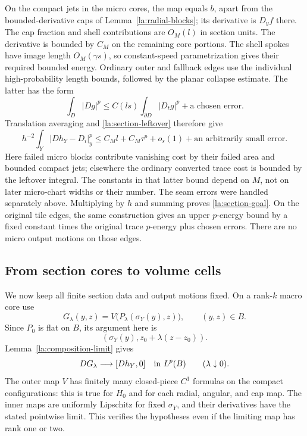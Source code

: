 On the compact jets in the micro cores, the map equals $b$, apart
from the bounded-derivative caps of Lemma~\ref{la:radial-blocks}; its
derivative is $D_yf$ there.  The cap fraction and shell contributions
are $O_M(l)$ in section units.  The derivative is bounded by $C_M$
on the remaining core portions.  The shell spokes have image length
$O_M(\gamma s)$, so constant-speed parametrization gives their
required bounded energy.  Ordinary outer and fallback edges use the
individual high-probability length bounds, followed by the planar
collapse estimate.  The latter has the form
\[
 \int_D|Dg|^p
       \le C(ls)\int_{\partial D}|D_tg|^p+\text{a chosen error}.
\]
Translation averaging and \eqref{la:section-leftover} therefore give
\begin{equation}\label{la:micro-section-error}
 h^{-2}\int_Y|Dh_Y-D_i|_y^p
       \le C_M l+C_M\tau^p+o_s(1)
                 +\text{an arbitrarily small error}.
\end{equation}
Here failed micro blocks contribute vanishing cost by their failed
area and bounded compact jets; elsewhere the ordinary converted
trace cost is bounded by the leftover integral.  The constants in
that latter bound depend on $M$, not on later micro-chart widths or
their number.  The seam errors were handled separately above.
Multiplying by $h$ and summing proves \eqref{la:section-goal}.
On the original tile edges, the same construction gives an upper
$p$-energy bound by a fixed constant times the original trace
$p$-energy plus chosen errors.  There are no micro output motions
on those edges.

\subsection{From section cores to volume cells}

We now keep all finite section data and output motions fixed.  On a
rank-$k$ macro core use
\begin{equation}\label{la:kernel-core-map}
 G_\lambda(y,z)
   =V\bigl(P_\lambda(\sigma_Y(y),z)\bigr),\qquad(y,z)\in B.
\end{equation}
Since $P_0$ is flat on $B$, its argument here is
\[
 (\sigma_Y(y),z_0+\lambda(z-z_0)).
\]
Lemma~\ref{la:composition-limit} gives
\begin{equation}\label{la:kernel-core-limit}
 DG_\lambda\longrightarrow[Dh_Y,0]
       \quad\hbox{in }L^p(B)\qquad(\lambda\downarrow0).
\end{equation}
The outer map $V$ has finitely many closed-piece $C^1$ formulas on
the compact configurations: this is true for $H_0$ and for each
radial, angular, and cap map.  The inner maps are uniformly Lipschitz
for fixed $\sigma_Y$, and their derivatives have the stated pointwise
limit.  This verifies the hypotheses even if the limiting map has
rank one or two.

